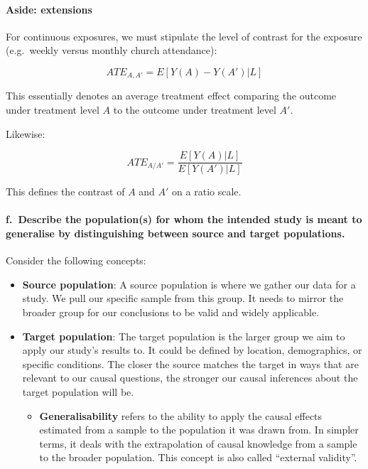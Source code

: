 \documentclass[
  singlecolumn]{article}
\let\oldparagraph\paragraph
\renewcommand{\paragraph}[1]{\oldparagraph{#1}\mbox{}}
\providecommand{\tightlist}{%
  \setlength{\itemsep}{0pt}\setlength{\parskip}{0pt}}\usepackage{longtable,booktabs,array}
\begin{document}
\hypertarget{aside-extensions}{%
\paragraph{Aside: extensions}\label{aside-extensions}}

For continuous exposures, we must stipulate the level of contrast for
the exposure (e.g.~weekly versus monthly church attendance):

\[ATE_{A,A'} = E[Y(A) - Y(A')| L]\]

This essentially denotes an average treatment effect comparing the
outcome under treatment level \(A\) to the outcome under treatment level
\(A'\).

Likewise:

\[ATE_{A/A'} = \frac{E[Y(A)| L]}{E[Y(A')| L]}\]

This defines the contrast of \(A\) and \(A'\) on a ratio scale.

\hypertarget{f.-describe-the-populations-for-whom-the-intended-study-is-meant-to-generalise-by-distinguishing-between-source-and-target-populations.}{%
\paragraph{f.~Describe the population(s) for whom the intended study is
meant to generalise by distinguishing between source and target
populations.}\label{f.-describe-the-populations-for-whom-the-intended-study-is-meant-to-generalise-by-distinguishing-between-source-and-target-populations.}}

Consider the following concepts:

\begin{itemize}
\item
  \textbf{Source population}: A source population is where we gather our
  data for a study. We pull our specific sample from this group. It
  needs to mirror the broader group for our conclusions to be valid and
  widely applicable.
\item
  \textbf{Target population}: The target population is the larger group
  we aim to apply our study's results to. It could be defined by
  location, demographics, or specific conditions. The closer the source
  matches the target in ways that are relevant to our causal questions,
  the stronger our causal inferences about the target population will
  be.

  \begin{itemize}
  \tightlist
  \item
    \textbf{Generalisability} refers to the ability to apply the causal
    effects estimated from a sample to the population it was drawn from.
    In simpler terms, it deals with the extrapolation of causal
    knowledge from a sample to the broader population. This concept is
    also called ``external validity''.
  \end{itemize}
\end{itemize}
\end{document}
